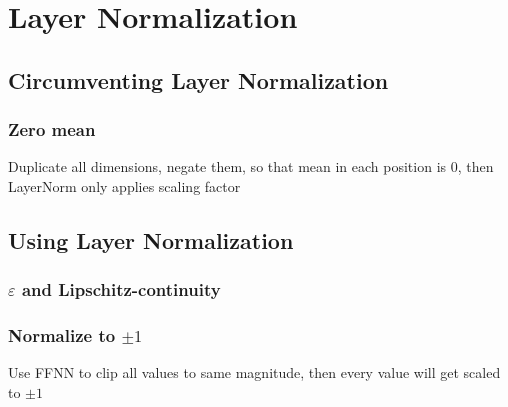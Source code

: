 \chapter{Layer Normalization}
\label{sec:layernorm}

\section{Circumventing Layer Normalization}

\subsection{Zero mean}

Duplicate all dimensions, negate them, so that mean in each position is $0$, then LayerNorm only applies scaling factor

\section{Using Layer Normalization}

\subsection{$\varepsilon$ and Lipschitz-continuity}

\subsection{Normalize to $\pm1$}

Use FFNN to clip all values to same magnitude, then every value will get scaled to $\pm 1$
